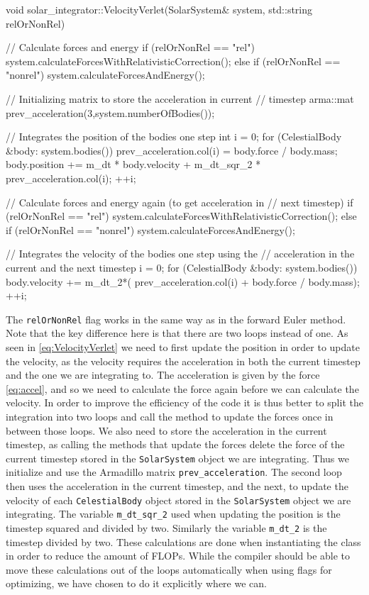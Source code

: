 \documentclass[reprint,english,notitlepage]{revtex4-1}  %
\begin{document}
\begin{cpp}
void solar_integrator::VelocityVerlet(SolarSystem& system,
									  std::string relOrNonRel) {
  // Calculate forces and energy
  if (relOrNonRel == "rel") {
    system.calculateForcesWithRelativisticCorrection();
  } else if (relOrNonRel == "nonrel") {
    system.calculateForcesAndEnergy();
  }

  // Initializing matrix to store the acceleration in current 
  // timestep
  arma::mat prev_acceleration(3,system.numberOfBodies());

  // Integrates the position of the bodies one step
  int i = 0;
  for (CelestialBody &body: system.bodies()) {
    prev_acceleration.col(i) = body.force / body.mass;
    body.position += m_dt * body.velocity 
    				 + m_dt_sqr_2 * prev_acceleration.col(i);
    ++i;
  }

  // Calculate forces and energy again (to get acceleration in 
  // next timestep)
  if (relOrNonRel == "rel") {
    system.calculateForcesWithRelativisticCorrection();
  } else if (relOrNonRel == "nonrel") {
    system.calculateForcesAndEnergy();
  }

  // Integrates the velocity of the bodies one step using the 
  // acceleration in the current and the next timestep
  i = 0;
  for (CelestialBody &body: system.bodies()) {
    body.velocity += m_dt_2*( prev_acceleration.col(i) 
    				 + body.force / body.mass);
    ++i;
  }
}
\end{cpp}

The \verb+relOrNonRel+ flag works in the same way as in the forward Euler method. Note that the key difference here is that there are two loops instead of one. As seen in \eqref{eq:VelocityVerlet} we need to first update the position in order to update the velocity, as the velocity requires the acceleration in both the current timestep and the one we are integrating to. The acceleration is given by the force \eqref{eq:accel}, and so we need to calculate the force again before we can calculate the velocity. In order to improve the efficiency of the code it is thus better to split the integration into two loops and call the method to update the forces once in between those loops. We also need to store the acceleration in the current timestep, as calling the methods that update the forces delete the force of the current timestep stored in the \verb+SolarSystem+ object we are integrating. Thus we initialize and use the Armadillo \citep{Armadillo} matrix \verb+prev_acceleration+. The second loop then uses the acceleration in the current timestep, and the next, to update the velocity of each \verb+CelestialBody+ object stored in the \verb+SolarSystem+ object we are integrating. The variable \verb+m_dt_sqr_2+ used when updating the position is the timestep squared and divided by two. Similarly the variable \verb+m_dt_2+ is the timestep divided by two. These calculations are done when instantiating the class in order to reduce the amount of FLOPs. While the compiler should be able to move these calculations out of the loops automatically when using flags for optimizing, we have chosen to do it explicitly where we can.
\end{document}
